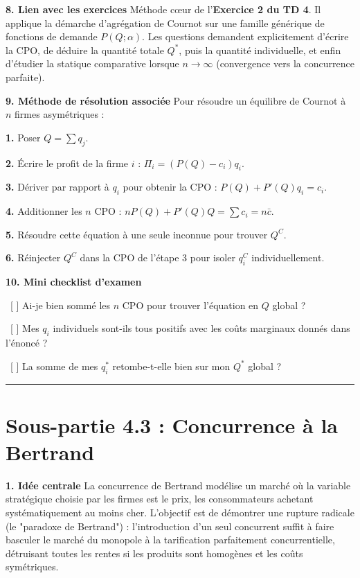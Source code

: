 \documentclass[11pt, a4paper]{report}
\begin{document}
\textbf{8. Lien avec les exercices}
Méthode cœur de l'\textbf{Exercice 2 du TD 4}. Il applique la démarche d'agrégation de Cournot sur une famille générique de fonctions de demande $P(Q;\alpha)$. Les questions demandent explicitement d'écrire la CPO, de déduire la quantité totale $Q^*$, puis la quantité individuelle, et enfin d'étudier la statique comparative lorsque $n \to \infty$ (convergence vers la concurrence parfaite).

\textbf{9. Méthode de résolution associée}
Pour résoudre un équilibre de Cournot à $n$ firmes asymétriques :
\par \textbf{1.} Poser $Q = \sum q_j$.
\par \textbf{2.} Écrire le profit de la firme $i$ : $\Pi_i = (P(Q) - c_i)q_i$.
\par \textbf{3.} Dériver par rapport à $q_i$ pour obtenir la CPO : $P(Q) + P'(Q)q_i = c_i$.
\par \textbf{4.} Additionner les $n$ CPO : $nP(Q) + P'(Q)Q = \sum c_i = n\bar{c}$.
\par \textbf{5.} Résoudre cette équation à une seule inconnue pour trouver $Q^C$.
\par \textbf{6.} Réinjecter $Q^C$ dans la CPO de l'étape 3 pour isoler $q_i^C$ individuellement.

\textbf{10. Mini checklist d’examen}
\par \textbullet\ [ ] Ai-je bien sommé les $n$ CPO pour trouver l'équation en $Q$ global ?
\par \textbullet\ [ ] Mes $q_i$ individuels sont-ils tous positifs avec les coûts marginaux donnés dans l'énoncé ?
\par \textbullet\ [ ] La somme de mes $q_i^*$ retombe-t-elle bien sur mon $Q^*$ global ?

\vspace{1cm}\hrule\vspace{1cm}

\section{Sous-partie 4.3 : Concurrence à la Bertrand}

\textbf{1. Idée centrale}
La concurrence de Bertrand modélise un marché où la variable stratégique choisie par les firmes est le prix, les consommateurs achetant systématiquement au moins cher. L'objectif est de démontrer une rupture radicale (le "paradoxe de Bertrand") : l'introduction d'un seul concurrent suffit à faire basculer le marché du monopole à la tarification parfaitement concurrentielle, détruisant toutes les rentes si les produits sont homogènes et les coûts symétriques.
\end{document}

